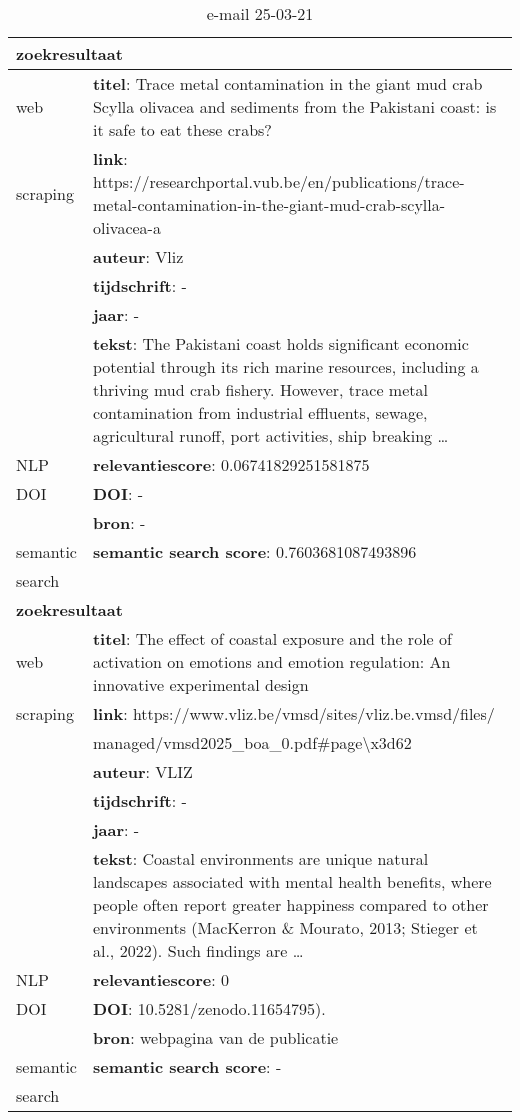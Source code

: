 \begin{table}[h!]
    \caption{e-mail 25-03-21}
    \centering
    \begin{tabularx}{\textwidth}{|p{4cm}|X|} 
        \hline
        \multicolumn{2}{|X|}{\textbf{zoekresultaat}} \\
        \hline
        web &\textbf{titel}: Trace metal contamination in the giant mud crab Scylla olivacea and sediments from the Pakistani coast: is it safe to eat these crabs?\\
        scraping&\textbf{link}: https://researchportal.vub.be/en/publications/trace-metal-contamination-in-the-giant-mud-crab-scylla-olivacea-a\\
        &\textbf{auteur}: Vliz\\
        &\textbf{tijdschrift}: -\\
        &\textbf{jaar}: -\\
        &\textbf{tekst}: The Pakistani coast holds significant economic potential through its rich marine resources, including a thriving mud crab fishery. However, trace metal contamination from industrial effluents, sewage, agricultural runoff, port activities, ship breaking …\\
        \hline
        NLP&\textbf{relevantiescore}: 0.06741829251581875\\
        \hline
        DOI&\textbf{DOI}: -\\
        &\textbf{bron}: -\\
        \hline
        semantic&\textbf{semantic search score}: 0.7603681087493896\\
        search&\\
        \hline
        \multicolumn{2}{|X|}{\textbf{zoekresultaat}} \\
        \hline
        web &\textbf{titel}: The effect of coastal exposure and the role of activation on emotions and emotion regulation: An innovative experimental design\\
        scraping&\textbf{link}: https://www.vliz.be/vmsd/sites/vliz.be.vmsd/files/\\&managed/vmsd2025\_boa\_0.pdf#page\textbackslash x3d62\\
         &\textbf{auteur}: VLIZ\\
        &\textbf{tijdschrift}: -\\
        &\textbf{jaar}: -\\
        &\textbf{tekst}: Coastal environments are unique natural landscapes associated with mental health benefits, where people often report greater happiness compared to other environments (MacKerron \& Mourato, 2013; Stieger et al., 2022). Such findings are …\\
        \hline
        NLP&\textbf{relevantiescore}: 0\\
        \hline
        DOI&\textbf{DOI}: 10.5281/zenodo.11654795).\\
        &\textbf{bron}: webpagina van de publicatie\\
        \hline
        semantic&\textbf{semantic search score}: -\\
        search&\\
        \hline
    \end{tabularx}
    \label{table:email20250321}
\end{table}
